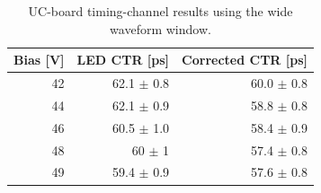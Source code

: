 \begin{table}[htbp]
\centering
\small
\begin{tabular}{rrr}
\toprule
Bias [V] & LED CTR [ps] & Corrected CTR [ps] \\
\midrule
42 & 62.1 $\pm$ 0.8 & 60.0 $\pm$ 0.8 \\
44 & 62.1 $\pm$ 0.9 & 58.8 $\pm$ 0.8 \\
46 & 60.5 $\pm$ 1.0 & 58.4 $\pm$ 0.9 \\
48 & 60 $\pm$ 1 & 57.4 $\pm$ 0.8 \\
49 & 59.4 $\pm$ 0.9 & 57.6 $\pm$ 0.8 \\
\bottomrule
\end{tabular}
\caption{UC-board timing-channel results using the wide waveform window.}
\label{tab:uc-timing-wide}
\end{table}
